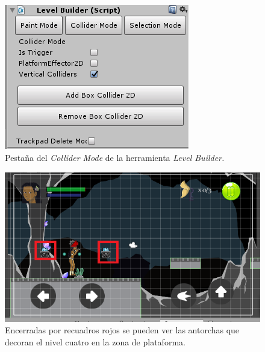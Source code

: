 \begin{figure}[h]
		\centering
		\includegraphics[height=0.2 \textheight]{03TrabajoRealizado/imagenes/levelBuilder03.png}
		\caption{Pestaña del \textit{Collider Mode} de la herramienta 
		\textit{Level 
		Builder.}}
		\label{fig:LevelBuilder02}
\end{figure}

\begin{figure}[h]
		\centering
		\includegraphics[height=0.2 \textheight]{03TrabajoRealizado/imagenes/objetosFondo.png}
		\caption{Encerradas por recuadros rojos se pueden ver las antorchas que decoran el nivel cuatro en la zona de plataforma.}
		\label{fig:ObjetoFon}
\end{figure}

